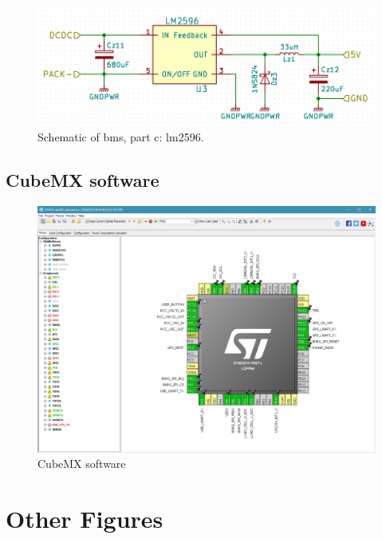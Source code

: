 \begin{figure}[h]
	\centering
    \includegraphics[width=\linewidth]{Figures/gasgauge_sch_lm2529.png}
	\caption{Schematic of \gls{bms}, part c: lm2596.}
	\label{fig:schbmsr}
\end{figure}


\clearpage
\subsection{CubeMX software}\label{sec:app:mxc}
\begin{figure}[tbh]
	\centering
    	\includegraphics[width=\linewidth]{Figures/MXCube.png}
	\caption{CubeMX software}
	\label{fig:mxc}
\end{figure}

\clearpage
\section{Other Figures}
